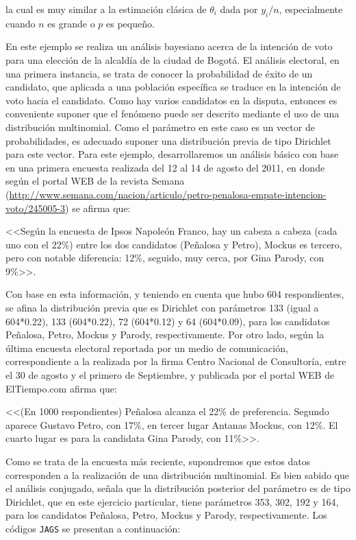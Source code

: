 la cual es muy similar a la estimación clásica de $\theta_i$ dada por $y_i/n$, especialmente cuando $n$ es grande o $p$ es pequeño.

\begin{Eje}\label{Multinomial}
En este ejemplo se realiza un análisis bayesiano acerca de la intención de voto para una elección de la alcaldía de la ciudad de Bogotá. El análisis electoral, en una primera instancia, se trata de conocer la probabilidad de éxito de un candidato, que aplicada a una población específica se traduce en la intención de voto hacia el candidato. Como hay varios candidatos en la disputa, entonces es conveniente suponer que el fenómeno puede ser descrito mediante el uso de una distribución multinomial. Como el parámetro en este caso es un vector de probabilidades, es adecuado suponer una distribución previa de tipo Dirichlet para este vector. Para este ejemplo, desarrollaremos un análisis básico con base en una primera encuesta realizada del 12 al 14 de agosto del 2011, en donde según el portal WEB de la revista Semana (\url{http://www.semana.com/nacion/articulo/petro-penalosa-empate-intencion-voto/245005-3}) se afirma que:
  
<<Según la encuesta de Ipsos Napoleón Franco, hay un cabeza a cabeza (cada uno con el 22\%) entre los dos candidatos (Peñalosa y Petro), Mockus es tercero, pero con notable diferencia: 12\%, seguido, muy cerca, por Gina Parody, con 9\%>>.

Con base en esta información, y teniendo en cuenta que hubo 604 respondientes, se afina la distribución previa que es Dirichlet con parámetros 133 (igual a 604*0.22), 133 (604*0.22), 72 (604*0.12) y 64 (604*0.09), para los candidatos Peñalosa, Petro, Mockus y Parody, respectivamente. Por otro lado, según la última encuesta electoral reportada por un medio de comunicación, correspondiente a la realizada por la firma Centro Nacional de Consultoría, entre el 30 de agosto y el primero de Septiembre, y publicada por el portal WEB de ElTiempo.com afirma que:

<<(En 1000 respondientes) Peñalosa alcanza el 22\% de preferencia. Segundo aparece Gustavo Petro, con 17\%, en tercer lugar Antanas Mockus, con 12\%. El cuarto lugar es para la candidata Gina Parody, con 11\%>>.

Como se trata de la encuesta más reciente, supondremos que estos datos corresponden a la realización de una distribución multinomial. Es bien sabido que el análisis conjugado, señala que la distribución posterior del parámetro es de tipo Dirichlet, que en este ejercicio particular, tiene parámetros 353, 302, 192 y 164, para los candidatos Peñalosa, Petro, Mockus y Parody, respectivamente. Los códigos \verb'JAGS' se presentan a continuación:


\end{Eje}
